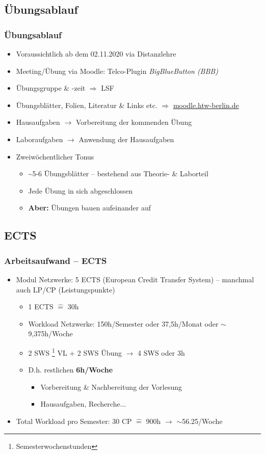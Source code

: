 \documentclass[xcolor=dvipsnames,aspectratio=169]{beamer}
\begin{document}
\subsection{Übungsablauf}
\begin{frame}
	\frametitle{Übungsablauf}
	\begin{itemize}
		\item Voraussichtlich ab dem 02.11.2020 via Distanzlehre
		\item Meeting/Übung via Moodle: Telco-Plugin \emph{BigBlueButton (BBB)}
		\item Übungsgruppe \& -zeit $\Rightarrow$ LSF
		\item Übungsblätter, Folien, Literatur \& Links etc. $\Rightarrow$ \url{moodle.htw-berlin.de}
		\item Hausaufgaben $\rightarrow$ Vorbereitung der kommenden Übung
		\item Laboraufgaben $\rightarrow$ Anwendung der Hausaufgaben
		\item Zweiwöchentlicher Tonus 
		\begin{itemize}
			\item \textasciitilde 5-6 Übungsblätter -- bestehend aus Theorie- \& Laborteil
			\item Jede Übung in sich abgeschlossen
			\item \textbf{Aber:} Übungen bauen aufeinander auf
		\end{itemize}
	\end{itemize}
\end{frame}


\subsection{ECTS}
\begin{frame}
	\frametitle{Arbeitsaufwand -- ECTS}
	\begin{itemize}
		\item Modul Netzwerke: 5 ECTS (European Credit Transfer System) -- manchmal auch LP/CP (Leistungspunkte)
			\begin{itemize}
				\item 1 ECTS $\widehat{=}$ 30h
				\item Workload Netzwerke: 150h/Semester oder 37,5h/Monat oder $\sim$ 9,375h/Woche
				\item 2 SWS \footnote{Semesterwochenstunden} VL + 2 SWS Übung $\rightarrow$ 4 SWS oder 3h
				\item D.h. restlichen \textbf{6h/Woche}
				\begin{itemize}
					\item Vorbereitung \& Nachbereitung der Vorlesung
					\item Hausaufgaben, Recherche...
				\end{itemize}
			\end{itemize}
			\item Total Workload pro Semester: 30 CP $\widehat{=}$ 900h $\rightarrow$  $\sim$56.25/Woche
	\end{itemize}
\end{frame}
\end{document}
